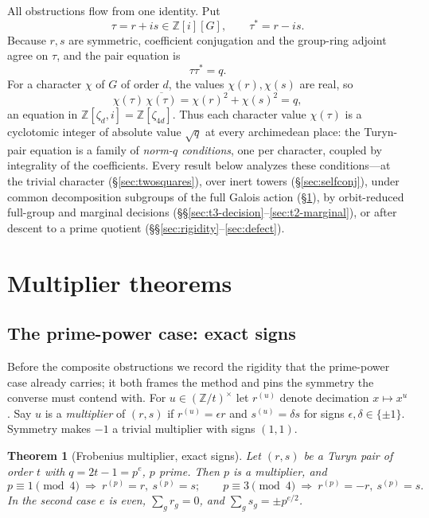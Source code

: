 \documentclass[11pt]{article}
\theoremstyle{plain}
\newtheorem{theorem}{Theorem}[section]
\theoremstyle{definition}
\theoremstyle{remark}
\newcommand{\Z}{\mathbb Z}
\begin{document}
All obstructions flow from one identity. Put
\[
  \tau=r+is\in\Z[i][G],\qquad \tau^*=r-is.
\]
Because $r,s$ are symmetric, coefficient conjugation and the group-ring adjoint
agree on $\tau$, and the pair equation is
\begin{equation}\label{eq:tau}
  \tau\tau^*=q.
\end{equation}
For a character $\chi$ of $G$ of order $d$, the values $\chi(r),\chi(s)$ are
real, so
\begin{equation}\label{eq:charnorm}
  \chi(\tau)\,\overline{\chi(\tau)}=\chi(r)^2+\chi(s)^2=q,
\end{equation}
an equation in $\Z[\zeta_d,i]=\Z[\zeta_{4d}]$. Thus each character value
$\chi(\tau)$ is a cyclotomic integer of absolute value $\sqrt q$ at every
archimedean place: the Turyn-pair equation is a family of \emph{norm-$q$
conditions}, one per character, coupled by integrality of the coefficients.
Every result below analyzes these conditions---at the trivial character
(\S\ref{sec:twosquares}), over inert towers (\S\ref{sec:selfconj}), under common
decomposition subgroups of the full Galois action (\S\ref{sec:multiplier}), by
orbit-reduced full-group and marginal decisions
(\S\S\ref{sec:t3-decision}--\ref{sec:t2-marginal}), or after descent to a prime
quotient (\S\S\ref{sec:rigidity}--\ref{sec:defect}).

\section{Multiplier theorems}\label{sec:multiplier}

\subsection{The prime-power case: exact signs}

Before the composite obstructions we record the rigidity that the prime-power
case already carries; it both frames the method and pins the symmetry the
converse must contend with. For $u\in(\Z/t)^\times$ let $r^{(u)}$ denote
decimation $x\mapsto x^u$. Say $u$ is a \emph{multiplier} of $(r,s)$ if
$r^{(u)}=\epsilon r$ and $s^{(u)}=\delta s$ for signs $\epsilon,\delta\in\{\pm1\}$.
Symmetry makes $-1$ a trivial multiplier with signs $(1,1)$.

\begin{theorem}[Frobenius multiplier, exact signs]\label{thm:multiplier}
Let $(r,s)$ be a Turyn pair of order $t$ with $q=2t-1=p^e$, $p$ prime. Then $p$
is a multiplier, and
\[
  p\equiv1\!\!\pmod4\ \Rightarrow\ r^{(p)}=r,\ s^{(p)}=s;
  \qquad
  p\equiv3\!\!\pmod4\ \Rightarrow\ r^{(p)}=-r,\ s^{(p)}=s.
\]
In the second case $e$ is even, $\sum_g r_g=0$, and $\sum_g s_g=\pm p^{e/2}$.
\end{theorem}
\end{document}
